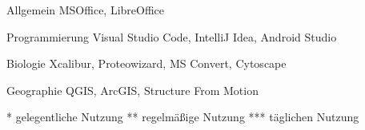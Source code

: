 

\begin{cvpairs}

  
\cvpair
    {Allgemein} %
    {MSOffice, LibreOffice} %

  
\cvpair
    {Programmierung} %
    {Visual Studio Code, IntelliJ Idea, Android Studio} %

  
\cvpair
    {Biologie} %
    {Xcalibur, Proteowizard, MS Convert, Cytoscape} %

  
\cvpair
    {Geographie} %
    {QGIS, ArcGIS, Structure From Motion} %

\end{cvpairs}

\bigskip
{\color{red}\footnotesize
* gelegentliche Nutzung \quad
** regelmäßige Nutzung \quad
*** täglichen Nutzung
}
